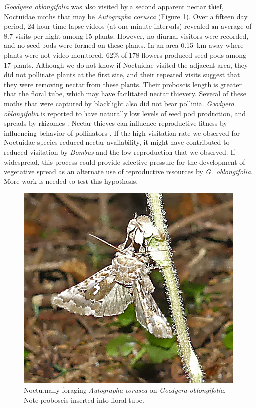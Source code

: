 \begin{multicols}{2}
\emph{Goodyera oblongifolia} was also visited by a second apparent
nectar thief, Noctuidae moths that may be \emph{Autographa corusca}
(Figure \ref{Goodyera_oblongifolia_Noctuidae}). Over a fifteen day period, 24 hour time-lapse videos (at
one minute intervals) revealed an average of 8.7 visits per night
among 15 plants. However, no diurnal visitors were recorded, and no seed
pods were formed on these plants. In an area 0.15~km away where plants
were not video monitored, 62\% of 178 flowers produced seed pods among
17 plants. Although we do not know if Noctuidae visited the adjacent
area, they did not pollinate plants at the first site, and their
repeated visits suggest that they were removing nectar from these
plants. Their proboscis length is greater that the floral tube, which
may have facilitated nectar thievery. Several of these moths that were
captured by blacklight also did not bear pollinia. \emph{Goodyera
oblongifolia} is reported to have naturally low levels of seed pod
production, and spreads by rhizomes \citep{Ackerman1975}. Nectar thieves can
influence reproductive fitness by influencing behavior of pollinators
\citep{Zhangetal2014}. If the high visitation rate we observed for
Noctuidae species reduced nectar availability, it might have contributed
to reduced visitation by \emph{Bombus} and the low reproduction that we
observed. If widespread, this process could provide selective pressure
for the development of vegetative spread as an alternate use of
reproductive resources by \emph{G.\ oblongifolia}. More work is needed to
test this hypothesis.

\begin{figure}[H]
\begin{center}
\vspace{2mm}
\includegraphics[width=\textwidth]{img/Goodyera_oblongifolia_Noctuidae.jpg}
\caption{Nocturnally foraging \emph{Autographa corusca} on \emph{Goodyera oblongifolia}.  Note proboscis inserted into floral tube.}
\label{Goodyera_oblongifolia_Noctuidae}
\end{center}
\end{figure}



\end{multicols}
